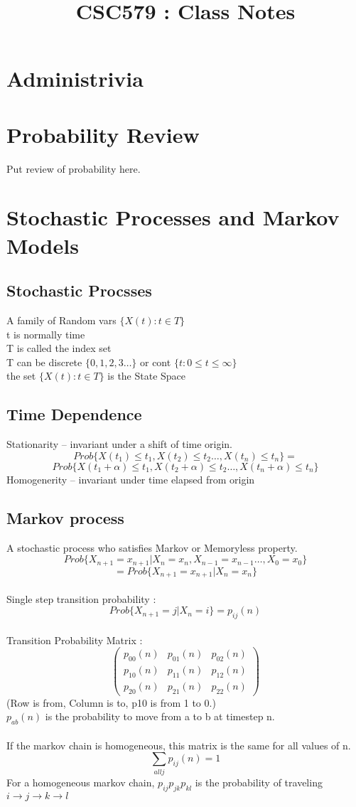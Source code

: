 \documentclass{article}
\begin{document}
\title{CSC579 : Class Notes}
\section {Administrivia}
\section{Probability Review}
Put review of probability here. 
\section{ Stochastic Processes and Markov Models }
	\subsection{Stochastic Procsses}
	  A family of Random vars $\{ X(t) : t\in T\}$ 
	\\\indent t is normally time  
    \\\indent T is called the index set 
    \\\indent T can be discrete $\{ 0,1,2,3 \ldots \}$ or cont $\{ t : 0 \le t \le \infty \}$
	\\\indent the set  $\{ X(t) : t \in T \}$ is the State Space 
	\\
	\subsection{Time Dependence}
	Stationarity -- invariant under a shift of time origin. 
	\[Prob\{ X(t_1) \le t_1, X(t_2) \le t_2 \ldots, X(t_n) \le t_n \} = \]
	\[Prob\{ X(t_1 + \alpha ) \le t_1, X(t_2 + \alpha ) \le t_2 \ldots, X(t_n +\alpha) \le t_n \}\]
	Homogenerity -- invariant under time elapsed from origin
	\\
	\subsection{Markov process}
	A stochastic process who satisfies Markov or Memoryless property. 
	\[Prob\{ X_{n+1} = x_{n+1} | X_n = x_n, X_{n-1} = x_{n-1} \ldots , X_0 = x_0 \}\]
	\[= Prob\{ X_{n+1} = x_{n+1} | X_n = x_n\}\]
	\\Single step transition probability :
	\[Prob\{X_{n+1} = j | X_n = i \} = p_{ij}(n) \]
	\\Transition Probability Matrix : 
	\[ \left( \begin{array}{ccc}
            p_{00}(n) & p_{01}(n) & p_{02}(n) \\
			p_{10}(n) & p_{11}(n) & p_{12}(n) \\
			p_{20}(n) & p_{21}(n) & p_{22}(n) 
	\end{array} \right)\] 
	(Row is from, Column is to, p10 is from 1 to 0.)
 	\\$p_{ab}(n)$ is the probability to move from a to b at timestep n.
	\\
 	\\If the markov chain is homogeneous, this matrix is the same for all values of n. 
	\[ \sum\limits_{all j}{p_{ij}(n)} = 1\]
	For a homogeneous markov chain, $p_{ij} p_{jk} p_{kl}$ is the probability of traveling $i\rightarrow j\rightarrow k\rightarrow l$
\end{document}
